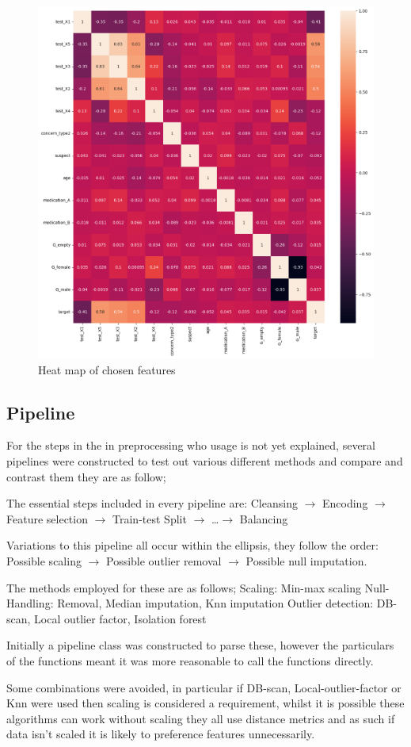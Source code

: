 \documentclass[a4paper]{article}
\begin{document}
\begin{figure}
    \centering
    \includegraphics[width=0.5\linewidth]{Materials/feature_heatmap.png}
    \caption{Heat map of chosen features}
    \label{fig:heatmap}
\end{figure}


\subsection{Pipeline} 

For the steps in the in preprocessing who usage is not yet explained, several pipelines were constructed to test out various different methods and compare and contrast them they are as follow;

The essential steps included in every pipeline are:
Cleansing $\rightarrow$ Encoding $\rightarrow$ Feature selection $\rightarrow$ Train-test Split $\rightarrow$ \ldots $\rightarrow$ Balancing

Variations to this pipeline all occur within the ellipsis, they follow the order: Possible scaling $\rightarrow$ Possible outlier removal $\rightarrow$ Possible null imputation.

The methods employed for these are as follows;
Scaling: Min-max scaling
Null-Handling: Removal, Median imputation, Knn imputation
Outlier detection: DB-scan, Local outlier factor, Isolation forest

Initially a pipeline class was constructed to parse these, however the particulars of the functions meant it was more reasonable to call the functions directly. 

Some combinations were avoided, in particular if DB-scan, Local-outlier-factor or Knn were used then scaling is considered a requirement, whilst it is possible these algorithms can work without scaling they all use distance metrics and as such if data isn't scaled it is likely to preference features unnecessarily.
\end{document}
